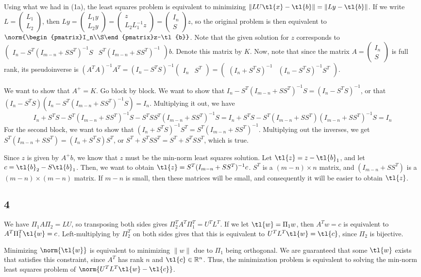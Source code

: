 \documentclass{article}
\newcommand{\openm}{\begin{pmatrix}}
\newcommand{\closem}{\end{pmatrix}}
\newcommand{\rn}{\mathbb{R}}
\begin{document}
Using what we had in (1a), the least squares problem is equivalent to minimizing $\|LU\tl{x}-\tl{b}\|=\|Ly-\tl{b}\|$. If we write $L=\openm L_1\\L_2\closem$, then $Ly=\openm L_1y\\L_2y\closem=\openm z\\L_2L_1^{-1}z\closem=\openm I_n\\S\closem z$, so the original problem is then equivalent to $\norm{\openm I_n\\S\closem z-\tl{b}}$. 
Note that the given solution for $z$ corresponds to $\openm I_n-S^T(I_{m-n}+SS^T)^{-1}S&S^T(I_{m-n}+SS^T)^{-1}\closem b$. Denote this matrix by $K$. Now, note that since the matrix $A=\openm I_n\\S\closem$ is full rank, its pseudoinverse is $(A^TA)^{-1}A^T=(I_n-S^TS)^{-1}\openm I_n&S^T\closem=\openm(I_n+S^TS)^{-1}&(I_n-S^TS)^{-1}S^T\closem$.

We want to show that $A^+=K$. Go block by block. We want to show that $I_n-S^T(I_{m-n}+SS^T)^{-1}S=(I_n-S^TS)^{-1}$, or that $(I_n-S^TS)(I_n-S^T(I_{m-n}+SS^T)^{-1}S)=I_n$. Multiplying it out, we have
\[I_n+S^TS-S^T(I_{m-n}+SS^T)^{-1}S-S^TSS^T(I_{m-n}+SS^T)^{-1}S=I_n+S^TS-S^T(I_{m-n}+SS^T)(I_{m-n}+SS^T)^{-1}S=I_n\]
For the second block, we want to show that $(I_n+S^TS)^{-1}S^T=S^T(I_{m-n}+SS^T)^{-1}$. Multiplying out the inverses, we get $S^T(I_{m-n}+SS^T)=(I_n+S^TS)S^T$, or $S^T+S^TSS^T=S^T+S^TSS^T$, which is true.

Since $z$ is given by $A^+b$, we know that $z$ must be the min-norm least squares solution.
Let $\tl{z}=z-\tl{b}_1$, and let $c=\tl{b}_2-S\tl{b}_1$. Then, we want to obtain $\tl{z}=S^T(I_{m-n}+SS^T)^{-1}c$. $S^T$ is a $(m-n)\times n$ matrix, and $(I_{m-n}+SS^T)$ is a $(m-n)\times(m-n)$ matrix. If $m-n$ is small, then these matrices will be small, and consequently it will be easier to obtain $\tl{z}$.
\subsection*{4}
We have $\Pi_1A\Pi_2=LU$, so transposing both sides gives $\Pi_2^TA^T\Pi_1^T=U^TL^T$. If we let $\tl{w}=\Pi_1w$, then $A^Tw=c$ is equivalent to $A^T\Pi_1^T\tl{w}=c$. Left-multiplying by $\Pi_2^T$ on both sides gives that this is equivalent to $U^TL^T\tl{w}=\tl{c}$, since $\Pi_2$ is bijective.

Minimizing $\norm{\tl{w}}$ is equivalent to minimizing $\|w\|$ due to $\Pi_1$ being orthogonal. We are guaranteed that some $\tl{w}$ exists that satisfies this constraint, since $A^T$ has rank $n$ and $\tl{c}\in\rn^n$. Thus, the minimization problem is equivalent to solving the min-norm least squares problem of $\norm{U^TL^T\tl{w}-\tl{c}}$. 
\end{document}
